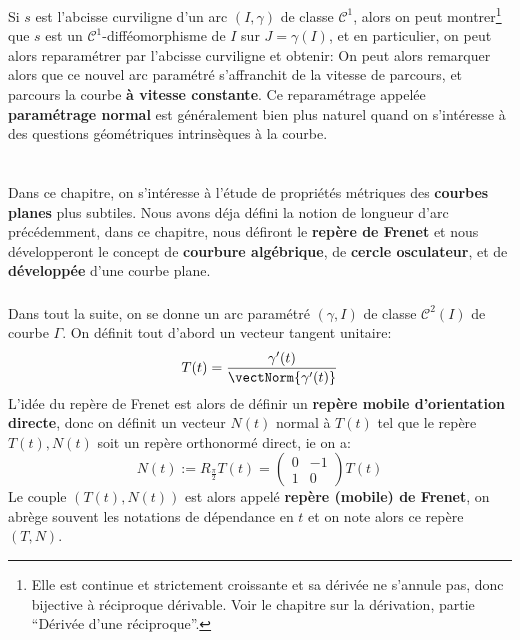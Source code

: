 \subsection*{}
Si \(s\) est l'abcisse curviligne d'un arc \((I, \gamma)\) de classe \(\mathcal{C}^1\), alors on peut montrer\footnote[3]{Elle est continue et strictement croissante et sa dérivée ne s'annule pas, donc bijective à réciproque dérivable. Voir le chapitre sur la dérivation, partie ``Dérivée d'une réciproque''.} que \(s\) est un \(\mathcal{C}^1\)-difféomorphisme de \(I\) sur \(J = \gamma(I)\), et en particulier, on peut alors reparamétrer par l'abcisse curviligne et obtenir:
On peut alors remarquer alors que ce nouvel arc paramétré s'affranchit de la vitesse de parcours, et parcours la courbe \textbf{à vitesse constante}. Ce reparamétrage appelée \textbf{paramétrage normal} est généralement bien plus naturel quand on s'intéresse à des questions géométriques intrinsèques à la courbe.
\chapter*{} %
Dans ce chapitre, on s'intéresse à l'étude de propriétés métriques des \textbf{courbes planes} plus subtiles. Nous avons déja défini la notion de longueur d'arc précédemment, dans ce chapitre, nous défiront le \textbf{repère de Frenet} et nous développeront le concept de \textbf{courbure algébrique}, de \textbf{cercle osculateur}, et de \textbf{développée} d'une courbe plane.

\subsection*{}
Dans tout la suite, on se donne un arc paramétré \((\gamma, I)\) de classe \(\mathcal{C}^2(I)\) de courbe \(\Gamma\). On définit tout d'abord un vecteur tangent unitaire:
\[
   T(t) = \frac{\gamma'(t)}{\vectNorm{\gamma'(t)}}
\]
L'idée du repère de Frenet est alors de définir un \textbf{repère mobile d'orientation directe}, donc on définit un vecteur \(N(t)\) normal à \(T(t)\) tel que le repère \(T(t), N(t)\) soit un repère orthonormé direct, ie on a:
\[
   N(t) := R_\frac{\pi}{2}T(t) = \begin{pmatrix} 0 & -1\\ 1 & 0\end{pmatrix} T(t) 
\]
Le couple \((T(t), N(t))\) est alors appelé \textbf{repère (mobile) de Frenet}, on abrège souvent les notations de dépendance en \(t\) et on note alors ce repère \((T, N)\).

